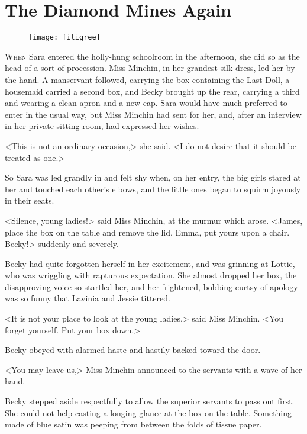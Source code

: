 \chapter{The Diamond Mines Again}

\begin{figure}[t!]
\centering
\texttt{[image: filigree]}
\end{figure}

\lettrine[lines=5]{W}{hen} Sara entered the holly-hung schoolroom in the afternoon, she did so as the head of a sort of procession. Miss Minchin, in her grandest silk dress, led her by the hand. A manservant followed, carrying the box containing the Last Doll, a housemaid carried a second box, and Becky brought up the rear, carrying a third and wearing a clean apron and a new cap. Sara would have much preferred to enter in the usual way, but Miss Minchin had sent for her, and, after an interview in her private sitting room, had expressed her wishes.

<This is not an ordinary occasion,> she said. <I do not desire that it should be treated as one.>

So Sara was led grandly in and felt shy when, on her entry, the big girls stared at her and touched each other's elbows, and the little ones began to squirm joyously in their seats.

<Silence, young ladies!> said Miss Minchin, at the murmur which arose. <James, place the box on the table and remove the lid. Emma, put yours upon a chair. Becky!> suddenly and severely.

Becky had quite forgotten herself in her excitement, and was grinning at Lottie, who was wriggling with rapturous expectation. She almost dropped her box, the disapproving voice so startled her, and her frightened, bobbing curtsy of apology was so funny that Lavinia and Jessie tittered.

<It is not your place to look at the young ladies,> said Miss Minchin. <You forget yourself. Put your box down.>

Becky obeyed with alarmed haste and hastily backed toward the door.

<You may leave us,> Miss Minchin announced to the servants with a wave of her hand.

Becky stepped aside respectfully to allow the superior servants to pass out first. She could not help casting a longing glance at the box on the table. Something made of blue satin was peeping from between the folds of tissue paper.

